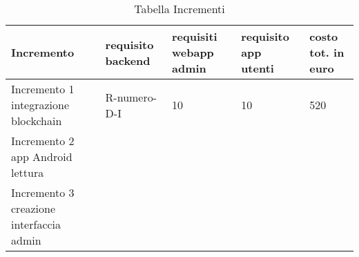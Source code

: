 \hypertarget{TabellaIncrementi}{}
\begin{longtable}{ C{0.15\textwidth} C{0.15\textwidth} C{0.15\textwidth} C{0.15\textwidth} C{0.15\textwidth} }
    \caption{Tabella Incrementi}                                                                                 \\
    \rowcolor{\primaryColor}
    \textcolor{\secondaryColor}{\textbf{Incremento}} & \textcolor{\secondaryColor}{\textbf{requisito backend}}  &\textcolor{\secondaryColor}{\textbf{requisiti webapp admin}}&\textcolor{\secondaryColor}{\textbf{requisito app utenti}}&\textcolor{\secondaryColor}{\textbf{costo tot. in euro}}\\ \endhead
    {Incremento 1 integrazione blockchain} & {R-numero-D-I } & {10 } & {10}&  {520}\\
    {Incremento 2 app Android lettura } & {} & {}& {}& {}\\
    {Incremento 3 creazione interfaccia admin} & {} & {}& {}& {}\\
\end{longtable}
